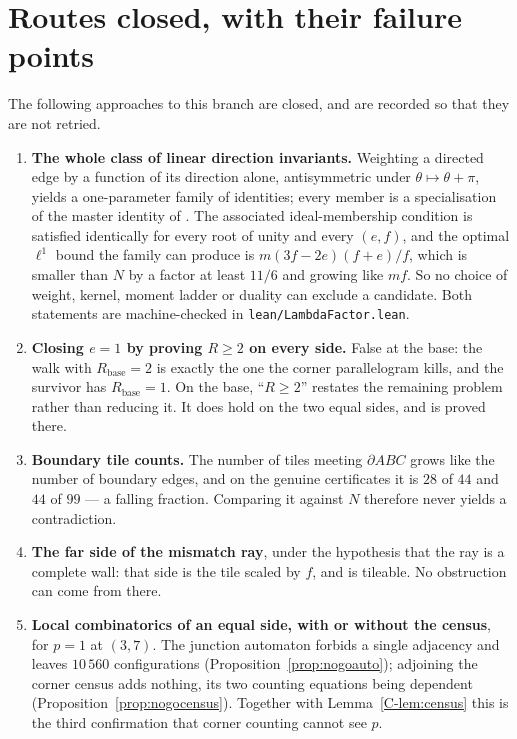 \documentclass[11pt,reqno]{amsart}
\theoremstyle{plain}
\theoremstyle{definition}
\begin{document}
\section{Routes closed, with their failure points}\label{sec:dead}

The following approaches to this branch are closed, and are recorded so that they are not retried.

\begin{enumerate}
\item \textbf{The whole class of linear direction invariants.} Weighting a directed edge by a
function of its direction alone, antisymmetric under $\theta\mapsto\theta+\pi$, yields a
one-parameter family of identities; every member is a specialisation of the master identity of
\cite[Rem.~4.9]{Main}. The associated ideal-membership condition is satisfied identically for every
root of unity and every $(e,f)$, and the optimal $\ell^1$ bound the family can produce is
$m(3f-2e)(f+e)/f$, which is smaller than $N$ by a factor at least $11/6$ and growing like $mf$. So
no choice of weight, kernel, moment ladder or duality can exclude a candidate. Both statements are
machine-checked in \texttt{lean/LambdaFactor.lean}.
\item \textbf{Closing $e=1$ by proving $R\ge2$ on every side.} False at the base: the walk with
$R_{\mathrm{base}}=2$ is exactly the one the corner parallelogram kills, and the survivor has
$R_{\mathrm{base}}=1$. On the base, ``$R\ge2$'' restates the remaining problem rather than reducing
it. It does hold on the two equal sides, and is proved there.
\item \textbf{Boundary tile counts.} The number of tiles meeting $\partial ABC$ grows like the
number of boundary edges, and on the genuine certificates it is $28$ of $44$ and $44$ of $99$ --- a
falling fraction. Comparing it against $N$ therefore never yields a contradiction.
\item \textbf{The far side of the mismatch ray}, under the hypothesis that the ray is a complete
wall: that side is the tile scaled by $f$, and is tileable. No obstruction can come from there.
\item \textbf{Local combinatorics of an equal side, with or without the census}, for $p=1$ at
$(3,7)$. The junction automaton forbids a single adjacency and leaves $10\,560$ configurations
(Proposition~\ref{prop:nogoauto}); adjoining the corner census adds nothing, its two counting
equations being dependent (Proposition~\ref{prop:nogocensus}). Together with
Lemma~\ref{C-lem:census} this is the third confirmation that corner counting cannot see $p$.

\end{enumerate}
\end{document}
